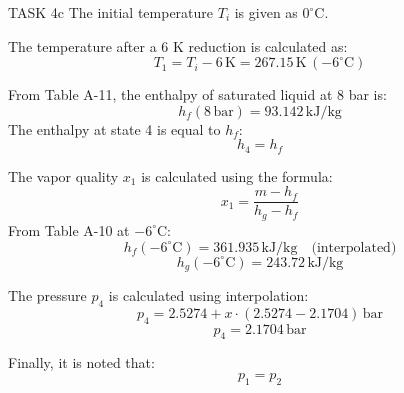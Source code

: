 TASK 4c  
The initial temperature \( T_i \) is given as \( 0^\circ\text{C} \).  

The temperature after a 6 K reduction is calculated as:  
\[
T_1 = T_i - 6 \, \text{K} = 267.15 \, \text{K} \, (-6^\circ\text{C})
\]  

From Table A-11, the enthalpy of saturated liquid at 8 bar is:  
\[
h_f(8 \, \text{bar}) = 93.142 \, \text{kJ/kg}
\]  
The enthalpy at state 4 is equal to \( h_f \):  
\[
h_4 = h_f
\]  

The vapor quality \( x_1 \) is calculated using the formula:  
\[
x_1 = \frac{m - h_f}{h_g - h_f}
\]  
From Table A-10 at \( -6^\circ\text{C} \):  
\[
h_f(-6^\circ\text{C}) = 361.935 \, \text{kJ/kg} \quad \text{(interpolated)}
\]  
\[
h_g(-6^\circ\text{C}) = 243.72 \, \text{kJ/kg}
\]  

The pressure \( p_4 \) is calculated using interpolation:  
\[
p_4 = 2.5274 + x \cdot (2.5274 - 2.1704) \, \text{bar}
\]  
\[
p_4 = 2.1704 \, \text{bar}
\]  

Finally, it is noted that:  
\[
p_1 = p_2
\]